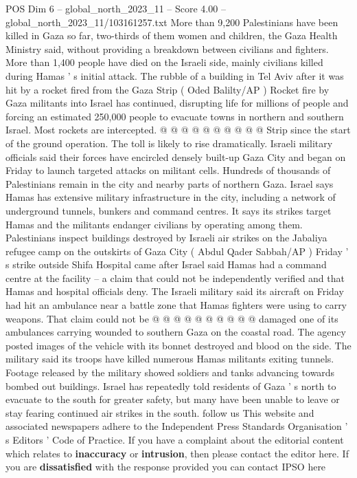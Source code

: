 \begin{textsample}{POS Dim 6 – global\_north\_2023\_11 – Score 4.00 – global\_north\_2023\_11/103161257.txt}
More than 9,200 Palestinians have been killed in Gaza so far, two-thirds of them women and children, the Gaza Health Ministry said, without providing a breakdown between civilians and fighters.
More than 1,400 people have died on the Israeli side, mainly civilians killed during Hamas ' s initial attack.
The rubble of a building in Tel Aviv after it was hit by a rocket fired from the Gaza Strip ( Oded Balilty/AP ) Rocket fire by Gaza militants into Israel has continued, disrupting life for millions of people and forcing an estimated 250,000 people to evacuate towns in northern and southern Israel.
Most rockets are intercepted. @ @ @ @ @ @ @ @ @ @ Strip since the start of the ground operation.
The toll is likely to rise dramatically.
Israeli military officials said their forces have encircled densely built-up Gaza City and began on Friday to launch targeted attacks on militant cells.
Hundreds of thousands of Palestinians remain in the city and nearby parts of northern Gaza.
Israel says Hamas has extensive military infrastructure in the city, including a network of underground tunnels, bunkers and command centres.
It says its strikes target Hamas and the militants endanger civilians by operating among them.
Palestinians inspect buildings destroyed by Israeli air strikes on the Jabaliya refugee camp on the outskirts of Gaza City ( Abdul Qader Sabbah/AP ) Friday ' s strike outside Shifa Hospital came after Israel said Hamas had a command centre at the facility -- a claim that could not be independently verified and that Hamas and hospital officials deny.
The Israeli military said its aircraft on Friday had hit an ambulance near a battle zone that Hamas fighters were using to carry weapons.
That claim could not be @ @ @ @ @ @ @ @ @ @ damaged one of its ambulances carrying wounded to southern Gaza on the coastal road.
The agency posted images of the vehicle with its bonnet destroyed and blood on the side.
The military said its troops have killed numerous Hamas militants exiting tunnels.
Footage released by the military showed soldiers and tanks advancing towards bombed out buildings.
Israel has repeatedly told residents of Gaza ' s north to evacuate to the south for greater safety, but many have been unable to leave or stay fearing continued air strikes in the south. follow us This website and associated newspapers adhere to the Independent Press Standards Organisation ' s Editors ' Code of Practice.
If you have a complaint about the editorial content which relates to \textbf{inaccuracy} or \textbf{intrusion}, then please contact the editor here.
If you are \textbf{dissatisfied} with the response provided you can contact IPSO here

\end{textsample}
